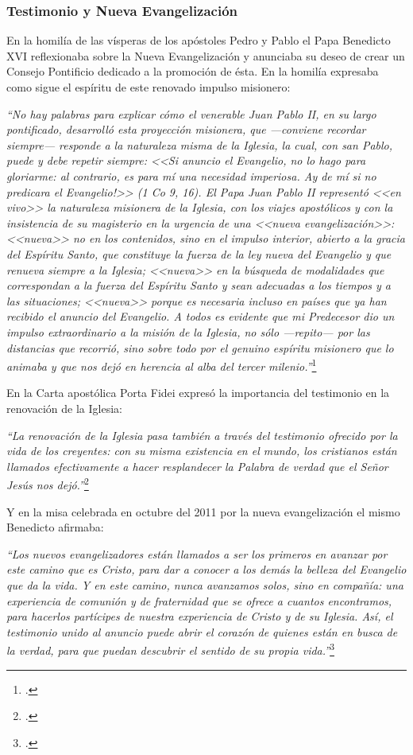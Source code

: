 \documentclass[11pt]{article}
\begin{document}
\subsubsection{Testimonio y Nueva Evangelización}
En la homilía de las vísperas de los apóstoles Pedro y Pablo el Papa Benedicto XVI reflexionaba sobre la Nueva Evangelización y anunciaba su deseo de crear un Consejo Pontificio dedicado a la promoción de ésta. En la homilía expresaba como sigue el espíritu de este renovado impulso misionero:

\emph{
``No hay palabras para explicar cómo el venerable Juan Pablo II, en su largo pontificado, desarrolló esta proyección misionera, que —conviene recordar siempre— responde a la naturaleza misma de la Iglesia, la cual, con san Pablo, puede y debe repetir siempre: <<Si anuncio el Evangelio, no lo hago para gloriarme: al contrario, es para mí una necesidad imperiosa. \textexclamdown{}Ay de mí si no predicara el Evangelio!>> (1 Co 9, 16). El Papa Juan Pablo II representó <<en vivo>> la naturaleza misionera de la Iglesia, con los viajes apostólicos y con la insistencia de su magisterio en la urgencia de una <<nueva evangelización>>: <<nueva>> no en los contenidos, sino en el impulso interior, abierto a la gracia del Espíritu Santo, que constituye la fuerza de la ley nueva del Evangelio y que renueva siempre a la Iglesia; <<nueva>> en la búsqueda de modalidades que correspondan a la fuerza del Espíritu Santo y sean adecuadas a los tiempos y a las situaciones; <<nueva>> porque es necesaria incluso en países que ya han recibido el anuncio del Evangelio. A todos es evidente que mi Predecesor dio un impulso extraordinario a la misión de la Iglesia, no sólo —repito— por las distancias que recorrió, sino sobre todo por el genuino espíritu misionero que lo animaba y que nos dejó en herencia al alba del tercer milenio.''}\footcite{benxvi_ne}

En la Carta apostólica Porta Fidei expresó la importancia del testimonio en la renovación de la Iglesia:

\emph{``La renovación de la Iglesia pasa también a través del testimonio ofrecido por la vida de los creyentes: con su misma existencia en el mundo, los cristianos están llamados efectivamente a hacer resplandecer la Palabra de verdad que el Señor Jesús nos dejó.''}\footcite[n. 6]{PF}

Y en la misa celebrada en octubre del 2011 por la nueva evangelización el mismo Benedicto afirmaba:

\emph{``Los nuevos evangelizadores están llamados a ser los primeros en avanzar por este camino que es Cristo, para dar a conocer a los demás la belleza del Evangelio que da la vida. Y en este camino, nunca avanzamos solos, sino en compañía: una experiencia de comunión y de fraternidad que se ofrece a cuantos encontramos, para hacerlos partícipes de nuestra experiencia de Cristo y de su Iglesia. Así, el testimonio unido al anuncio puede abrir el corazón de quienes están en busca de la verdad, para que puedan descubrir el sentido de su propia vida.''}\footcite{benxvi_ne2}
\end{document}
